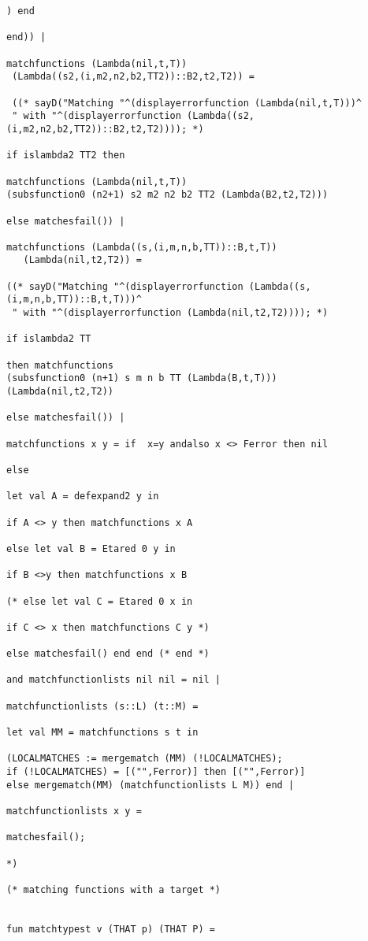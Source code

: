 \documentclass[12pt]{article}
\begin{document}
\begin{verbatim}
) end

end)) |

matchfunctions (Lambda(nil,t,T)) 
 (Lambda((s2,(i,m2,n2,b2,TT2))::B2,t2,T2)) =
 
 ((* sayD("Matching "^(displayerrorfunction (Lambda(nil,t,T)))^
 " with "^(displayerrorfunction (Lambda((s2,(i,m2,n2,b2,TT2))::B2,t2,T2)))); *)

if islambda2 TT2 then

matchfunctions (Lambda(nil,t,T))
(subsfunction0 (n2+1) s2 m2 n2 b2 TT2 (Lambda(B2,t2,T2))) 

else matchesfail()) |

matchfunctions (Lambda((s,(i,m,n,b,TT))::B,t,T))
   (Lambda(nil,t2,T2)) = 
   
((* sayD("Matching "^(displayerrorfunction (Lambda((s,(i,m,n,b,TT))::B,t,T)))^
 " with "^(displayerrorfunction (Lambda(nil,t2,T2)))); *)

if islambda2 TT 

then matchfunctions
(subsfunction0 (n+1) s m n b TT (Lambda(B,t,T)))
(Lambda(nil,t2,T2))

else matchesfail()) |

matchfunctions x y = if  x=y andalso x <> Ferror then nil

else 

let val A = defexpand2 y in 

if A <> y then matchfunctions x A

else let val B = Etared 0 y in

if B <>y then matchfunctions x B

(* else let val C = Etared 0 x in

if C <> x then matchfunctions C y *)

else matchesfail() end end (* end *)

and matchfunctionlists nil nil = nil |

matchfunctionlists (s::L) (t::M) =

let val MM = matchfunctions s t in

(LOCALMATCHES := mergematch (MM) (!LOCALMATCHES);
if (!LOCALMATCHES) = [("",Ferror)] then [("",Ferror)]
else mergematch(MM) (matchfunctionlists L M)) end |

matchfunctionlists x y = 

matchesfail();

*)

(* matching functions with a target *)


fun matchtypest v (THAT p) (THAT P) = 


\end{verbatim}
\end{document}
